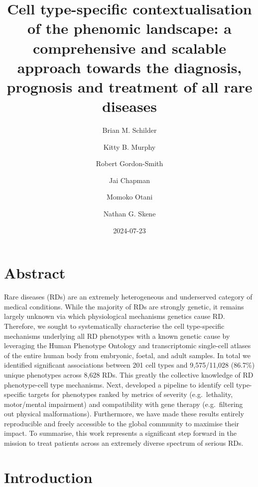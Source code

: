 \documentclass[
]{report}
\title{Cell type-specific contextualisation of the phenomic landscape: a
comprehensive and scalable approach towards the diagnosis, prognosis and
treatment of all rare diseases}
\author{Brian M. Schilder \and Kitty B. Murphy \and Robert
Gordon-Smith \and Jai Chapman \and Momoko Otani \and Nathan G. Skene}
\date{2024-07-23}
\begin{document}
\maketitle


\newpage{}

\section{Abstract}\label{abstract}

Rare diseases (RDs) are an extremely heterogeneous and underserved
category of medical conditions. While the majority of RDs are strongly
genetic, it remains largely unknown via which physiological mechanisms
genetics cause RD. Therefore, we sought to systematically characterise
the cell type-specific mechanisms underlying all RD phenotypes with a
known genetic cause by leveraging the Human Phenotype Ontology and
transcriptomic single-cell atlases of the entire human body from
embryonic, foetal, and adult samples. In total we identified significant
associations between 201 cell types and 9,575/11,028 (86.7\%) unique
phenotypes across 8,628 RDs. This greatly the collective knowledge of RD
phenotype-cell type mechanisms. Next, developed a pipeline to identify
cell type-specific targets for phenotypes ranked by metrics of severity
(e.g.~lethality, motor/mental impairment) and compatibility with gene
therapy (e.g.~filtering out physical malformations). Furthermore, we
have made these results entirely reproducible and freely accessible to
the global community to maximise their impact. To summarise, this work
represents a significant step forward in the mission to treat patients
across an extremely diverse spectrum of serious RDs.

\section{Introduction}\label{sec-introduction}
\end{document}
